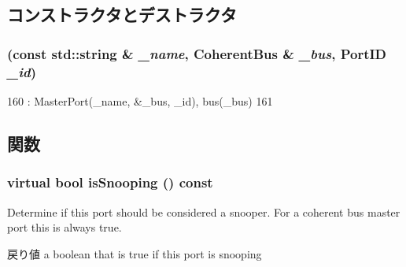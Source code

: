 \subsection{コンストラクタとデストラクタ}
\hypertarget{classCoherentBus_1_1CoherentBusMasterPort_adb2bec6a04a297da2caffbe21d6c8fc0}{
\subsubsection[{CoherentBusMasterPort}]{ (const std::string \& {\em \_\-name}, \/  {\bf CoherentBus} \& {\em \_\-bus}, \/  {\bf PortID} {\em \_\-id})}}
\label{classCoherentBus_1_1CoherentBusMasterPort_adb2bec6a04a297da2caffbe21d6c8fc0}



\begin{DoxyCode}
160             : MasterPort(_name, &_bus, _id), bus(_bus)
161         { }
\end{DoxyCode}


\subsection{関数}
\hypertarget{classCoherentBus_1_1CoherentBusMasterPort_a32602a6a3c3d66a639455036d6c08dd6}{
\subsubsection[{isSnooping}]{\setlength{\rightskip}{0pt plus 5cm}virtual bool isSnooping () const}}
\label{classCoherentBus_1_1CoherentBusMasterPort_a32602a6a3c3d66a639455036d6c08dd6}
Determine if this port should be considered a snooper. For a coherent bus master port this is always true.

\begin{DoxyReturn}{戻り値}
a boolean that is true if this port is snooping 
\end{DoxyReturn}


